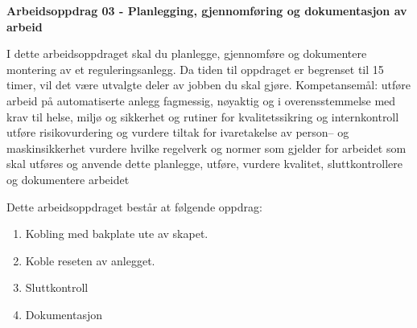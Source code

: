 
\noindent
{\bf Arbeidsoppdrag 03 - Planlegging, gjennomføring  og dokumentasjon  av arbeid}

I dette arbeidsoppdraget skal du planlegge, gjennomføre og dokumentere montering av et reguleringsanlegg. Da tiden til oppdraget er begrenset til 15  timer, vil det være utvalgte deler av jobben du skal gjøre. 
\vskip 5pt
Kompetansemål:
utføre arbeid på automatiserte anlegg fagmessig, nøyaktig og i overensstemmelse med krav til helse, miljø og sikkerhet og rutiner for kvalitetssikring og internkontroll
utføre risikovurdering og vurdere tiltak for ivaretakelse av person– og maskinsikkerhet
vurdere hvilke regelverk og normer som gjelder for arbeidet som skal utføres og anvende dette
planlegge, utføre, vurdere kvalitet, sluttkontrollere og dokumentere arbeidet


Dette arbeidsoppdraget består at følgende oppdrag:
\begin{enumerate}
	\item Kobling med bakplate ute av skapet. 
	\item Koble reseten av anlegget. 
	\item Sluttkontroll
	\item Dokumentasjon
\end{enumerate}
\vskip 5pt



